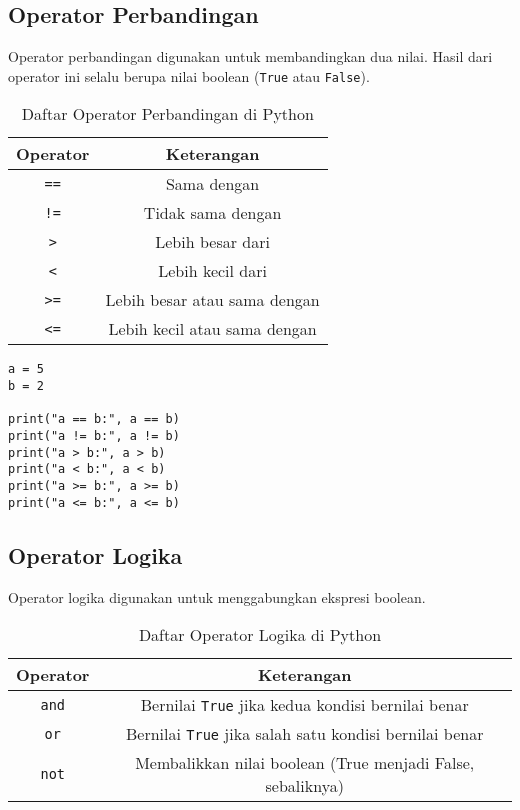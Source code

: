 \subsection{Operator Perbandingan}
Operator perbandingan digunakan untuk membandingkan dua nilai. 
Hasil dari operator ini selalu berupa nilai boolean (\texttt{True} atau \texttt{False}).

\begin{table}[H]
\centering
\begin{tabular}{|c|c|}
\hline
\textbf{Operator} & \textbf{Keterangan} \\
\hline
\texttt{==} & Sama dengan \\
\hline
\texttt{!=} & Tidak sama dengan \\
\hline
\texttt{>} & Lebih besar dari \\
\hline
\texttt{<} & Lebih kecil dari \\
\hline
\texttt{>=} & Lebih besar atau sama dengan \\
\hline
\texttt{<=} & Lebih kecil atau sama dengan \\
\hline
\end{tabular}
\caption{Daftar Operator Perbandingan di Python}
\end{table}

\begin{lstlisting}[style=PythonStyle, caption={Kode Python: comparison_operator.py}]
a = 5
b = 2

print("a == b:", a == b)
print("a != b:", a != b)
print("a > b:", a > b)
print("a < b:", a < b)
print("a >= b:", a >= b)
print("a <= b:", a <= b)
\end{lstlisting}

\subsection{Operator Logika}
Operator logika digunakan untuk menggabungkan ekspresi boolean.

\begin{table}[H]
\centering
\begin{tabular}{|c|c|}
\hline
\textbf{Operator} & \textbf{Keterangan} \\
\hline
\texttt{and} & Bernilai \texttt{True} jika kedua kondisi bernilai benar \\
\hline
\texttt{or} & Bernilai \texttt{True} jika salah satu kondisi bernilai benar \\
\hline
\texttt{not} & Membalikkan nilai boolean (True menjadi False, sebaliknya) \\
\hline
\end{tabular}
\caption{Daftar Operator Logika di Python}
\end{table}

